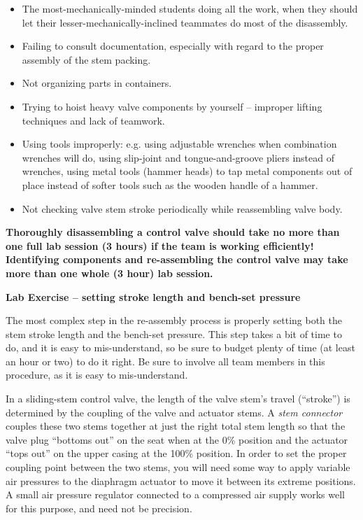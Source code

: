 \begin{itemize}
\item{} The most-mechanically-minded students doing all the work, when they should let their lesser-mechanically-inclined teammates do most of the disassembly.
\item{} Failing to consult documentation, especially with regard to the proper assembly of the stem packing.
\item{} Not organizing parts in containers.
\item{} Trying to hoist heavy valve components by yourself -- improper lifting techniques and lack of teamwork.
\item{} Using tools improperly: e.g. using adjustable wrenches when combination wrenches will do, using slip-joint and tongue-and-groove pliers instead of wrenches, using metal tools (hammer heads) to tap metal components out of place instead of softer tools such as the wooden handle of a hammer.
\item{} Not checking valve stem stroke periodically while reassembling valve body.
\end{itemize}

\vskip 10pt

{\bf Thoroughly disassembling a control valve should take no more than one full lab session (3 hours) if the team is working efficiently!  Identifying components and re-assembling the control valve may take more than one whole (3 hour) lab session.}


\vfil \eject

\noindent
{\bf Lab Exercise -- setting stroke length and bench-set pressure}

\vskip 5pt

The most complex step in the re-assembly process is properly setting both the stem stroke length and the bench-set pressure.  This step takes a bit of time to do, and it is easy to mis-understand, so be sure to budget plenty of time (at least an hour or two) to do it right.  Be sure to involve all team members in this procedure, as it is easy to mis-understand.

In a sliding-stem control valve, the length of the valve stem's travel (``stroke'') is determined by the coupling of the valve and actuator stems.  A {\it stem connector} couples these two stems together at just the right total stem length so that the valve plug ``bottoms out'' on the seat when at the 0\% position and the actuator ``tops out'' on the upper casing at the 100\% position.  In order to set the proper coupling point between the two stems, you will need some way to apply variable air pressures to the diaphragm actuator to move it between its extreme positions.  A small air pressure regulator connected to a compressed air supply works well for this purpose, and need not be precision.

